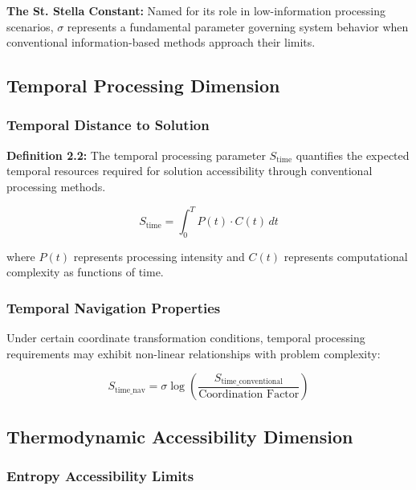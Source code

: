 \documentclass[11pt]{article}
\begin{document}
\textbf{The St. Stella Constant:} Named for its role in low-information processing scenarios, $\sigma$ represents a fundamental parameter governing system behavior when conventional information-based methods approach their limits.

\subsection{Temporal Processing Dimension}

\subsubsection{Temporal Distance to Solution}

\textbf{Definition 2.2:} The temporal processing parameter $S_{\text{time}}$ quantifies the expected temporal resources required for solution accessibility through conventional processing methods.

\begin{equation}
S_{\text{time}} = \int_0^T P(t) \cdot C(t) \, dt
\label{eq:temporal_processing}
\end{equation}

where $P(t)$ represents processing intensity and $C(t)$ represents computational complexity as functions of time.

\subsubsection{Temporal Navigation Properties}

Under certain coordinate transformation conditions, temporal processing requirements may exhibit non-linear relationships with problem complexity:

\begin{equation}
S_{\text{time\_nav}} = \sigma \log\left(\frac{S_{\text{time\_conventional}}}{\text{Coordination Factor}}\right)
\label{eq:temporal_navigation}
\end{equation}

\subsection{Thermodynamic Accessibility Dimension}

\subsubsection{Entropy Accessibility Limits}
\end{document}

